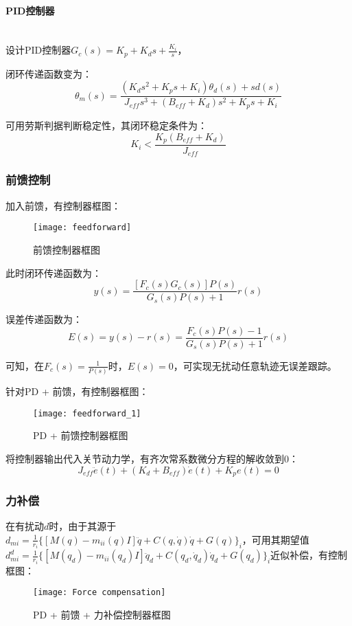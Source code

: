 \documentclass[
12pt, %
a4paper, 
oneside, %
headinclude,footinclude, %
]{scrartcl}
\begin{document}
\paragraph{PID控制器}~\\

设计PID控制器$ G_c(s) = K_p + K_d s + \frac{K_i}{s} $，

闭环传递函数变为：
$$ \theta_m(s) = \frac{(K_d s^2 + K_p s + K_i)\theta_d(s) + s d(s)}{J_{eff}s^3 + (B_{eff} + K_d)s^2 + K_p s + K_i} $$

可用劳斯判据判断稳定性，其闭环稳定条件为：
$$ K_i < \frac{K_p(B_{eff} + K_d)}{J_{eff}} $$
\subsubsection[前馈控制]{前馈控制}
加入前馈，有控制器框图：

\begin{figure}[H]
\centering 
\texttt{[image: feedforward]} 
\caption{前馈控制器框图}
\end{figure}

此时闭环传递函数为：
$$ y(s) = \frac{[F_c(s)G_c(s)]P(s)}{G_s(s)P(s) + 1}r(s) $$

误差传递函数为：
$$ E(s) = y(s) - r(s) = \frac{F_c(s)P(s) - 1}{G_s(s)P(s) + 1}r(s) $$

可知，在$ F_c(s) = \frac{1}{P(s)} $时，$ E(s) = 0 $，可实现无扰动任意轨迹无误差跟踪。

针对PD + 前馈，有控制器框图：
\begin{figure}[H]
\centering 
\texttt{[image: feedforward\_1]} 
\caption{PD + 前馈控制器框图}
\end{figure}

将控制器输出代入关节动力学，有齐次常系数微分方程的解收敛到$ 0 $：
$$ J_{eff}\ddot{e}(t) + (K_d + B_{eff})\dot{e}(t) + K_p e(t) = 0 $$
\subsubsection[力补偿]{力补偿}
在有扰动$ d $时，由于其源于$ d_{mi} = \frac{1}{r_i}\{[M(q) - m_{ii}(q)I]\ddot{q} + C(q, \dot{q})\dot{q} + G(q)\}_i $，可用其期望值$ d_{mi}^d = \frac{1}{r_i}\{[M(q_d) - m_{ii}(q_d)I]\ddot{q}_d + C(q_d, \dot{q}_d)\dot{q}_d + G(q_d)\}_i $近似补偿，有控制框图：

\begin{figure}[H]
\centering 
\texttt{[image: Force compensation]} 
\caption{PD + 前馈 + 力补偿控制器框图}
\end{figure}
\end{document}
